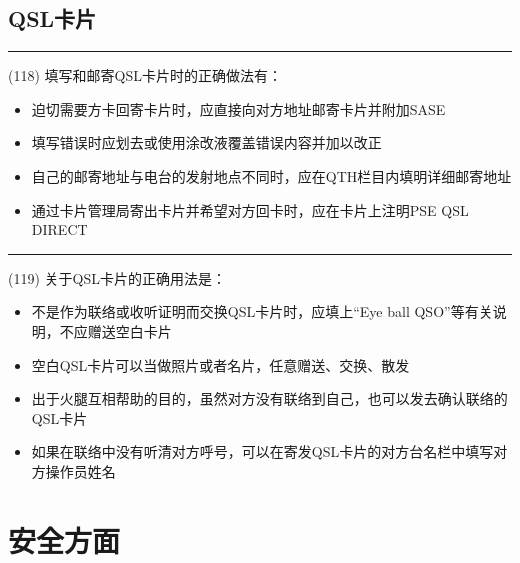 \documentclass[twocolumn,hyperref,UTF8]{ctexart}  %
\begin{document}
\clearpage
\subsection{QSL卡片}


\noindent\rule{0.5\textwidth}{1pt}
\heiti (118) 填写和邮寄QSL卡片时的正确做法有： \songti {\color{gray} [LK1011] }
\begin{itemize}
	\item  迫切需要方卡回寄卡片时，应直接向对方地址邮寄卡片并附加SASE
	\item  填写错误时应划去或使用涂改液覆盖错误内容并加以改正
	\item  自己的邮寄地址与电台的发射地点不同时，应在QTH栏目内填明详细邮寄地址
	\item  通过卡片管理局寄出卡片并希望对方回卡时，应在卡片上注明PSE QSL DIRECT
\end{itemize}


\noindent\rule{0.5\textwidth}{1pt}
\heiti (119) 关于QSL卡片的正确用法是： \songti {\color{gray} [LK1042] }
\begin{itemize}
	\item  不是作为联络或收听证明而交换QSL卡片时，应填上“Eye ball QSO”等有关说明，不应赠送空白卡片
	\item  空白QSL卡片可以当做照片或者名片，任意赠送、交换、散发
	\item  出于火腿互相帮助的目的，虽然对方没有联络到自己，也可以发去确认联络的QSL卡片
	\item  如果在联络中没有听清对方呼号，可以在寄发QSL卡片的对方台名栏中填写对方操作员姓名
\end{itemize}




















\clearpage
\section{安全方面}
\end{document}
